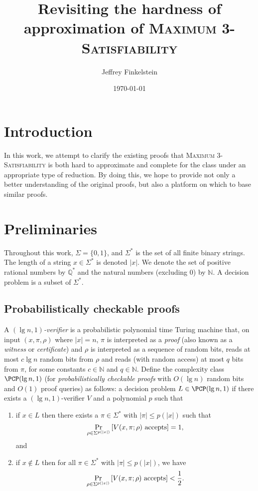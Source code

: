 \documentclass[]{article}
\author{Jef{}frey Finkelstein}
\date{\today}
\title{Revisiting the hardness of approximation of \texorpdfstring{\textsc{Maximum 3-Satisfiability}}{Maximum 3-Satisfiability}}
\theoremstyle{plain}
\theoremstyle{definition}
\begin{document}
\maketitle

\section{Introduction}

In this work, we attempt to clarify the existing proofs that \textsc{Maximum 3-Satisfiability} is both hard to approximate and complete for the class \APX{} under an appropriate type of reduction.
By doing this, we hope to provide not only a better understanding of the original proofs, but also a platform on which to base similar proofs.

\section{Preliminaries}

Throughout this work, $\Sigma=\{0, 1\}$, and $\Sigma^*$ is the set of all finite binary strings.
The length of a string $x \in \Sigma^*$ is denoted $|x|$.
We denote the set of positive rational numbers by $\mathbb{Q}^*$ and the natural numbers (excluding 0) by $\mathbb{N}$.
A decision problem is a subset of $\Sigma^*$.

\subsection{Probabilistically checkable proofs}

A \emph{$(\lg n, 1)$-verifier} is a probabilistic polynomial time Turing machine that, on input $(x, \pi, \rho)$ where $|x| = n$, $\pi$ is interpreted as a \emph{proof} (also known as a \emph{witness} or \emph{certificate}) and $\rho$ is interpreted as a sequence of random bits, reads at most $c \lg n$ random bits from $\rho$ and reads (with random access) at most $q$ bits from $\pi$, for some constants $c \in \mathbb{N}$ and $q \in \mathbb{N}$.
Define the complexity class $\PCP(\lg n, 1)$ (for \emph{probabilistically checkable proofs} with $O(\lg n)$ random bits and $O(1)$ proof queries) as follows: a decision problem $L \in \PCP(\lg n, 1)$ if there exists a $(\lg n, 1)$-verifier $V$ and a polynomial $p$ such that
\begin{enumerate}
\item
  if $x \in L$ then there exists a $\pi \in \Sigma^*$ with $|\pi| \leq p(|x|)$ such that
  \begin{displaymath}
    \Pr_{\rho \in \Sigma^{p(|x|)}}\left[V(x, \pi; \rho) \textnormal{ accepts}\right] = 1,
  \end{displaymath}
  and
\item
  if $x \notin L$ then for all $\pi \in \Sigma^*$ with $|\pi| \leq p(|x|)$, we have
  \begin{displaymath}
    \Pr_{\rho \in \Sigma^{p(|x|)}}\left[V(x, \pi; \rho) \textnormal{ accepts}\right] < \frac{1}{2}.
  \end{displaymath}
\end{enumerate}
\end{document}
